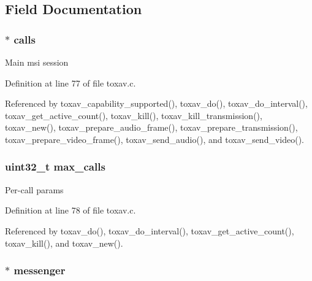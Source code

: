 \subsection{Field Documentation}
\hypertarget{struct___tox_av_abe854f89ac28ebd5112d1639d531b128}{
\subsubsection[{calls}]{$\ast$ calls}}\label{struct___tox_av_abe854f89ac28ebd5112d1639d531b128}
Main msi session 

Definition at line 77 of file toxav.\+c.



Referenced by toxav\+\_\+capability\+\_\+supported(), toxav\+\_\+do(), toxav\+\_\+do\+\_\+interval(), toxav\+\_\+get\+\_\+active\+\_\+count(), toxav\+\_\+kill(), toxav\+\_\+kill\+\_\+transmission(), toxav\+\_\+new(), toxav\+\_\+prepare\+\_\+audio\+\_\+frame(), toxav\+\_\+prepare\+\_\+transmission(), toxav\+\_\+prepare\+\_\+video\+\_\+frame(), toxav\+\_\+send\+\_\+audio(), and toxav\+\_\+send\+\_\+video().

\hypertarget{struct___tox_av_a7d6cf32eb812384ebd4074c588c17499}{
\subsubsection[{max\+\_\+calls}]{\setlength{\rightskip}{0pt plus 5cm}uint32\+\_\+t max\+\_\+calls}}\label{struct___tox_av_a7d6cf32eb812384ebd4074c588c17499}
Per-\/call params 

Definition at line 78 of file toxav.\+c.



Referenced by toxav\+\_\+do(), toxav\+\_\+do\+\_\+interval(), toxav\+\_\+get\+\_\+active\+\_\+count(), toxav\+\_\+kill(), and toxav\+\_\+new().

\hypertarget{struct___tox_av_a48342badc24a04d2310ca16ff4a3711b}{
\subsubsection[{messenger}]{$\ast$ messenger}}\label{struct___tox_av_a48342badc24a04d2310ca16ff4a3711b}


